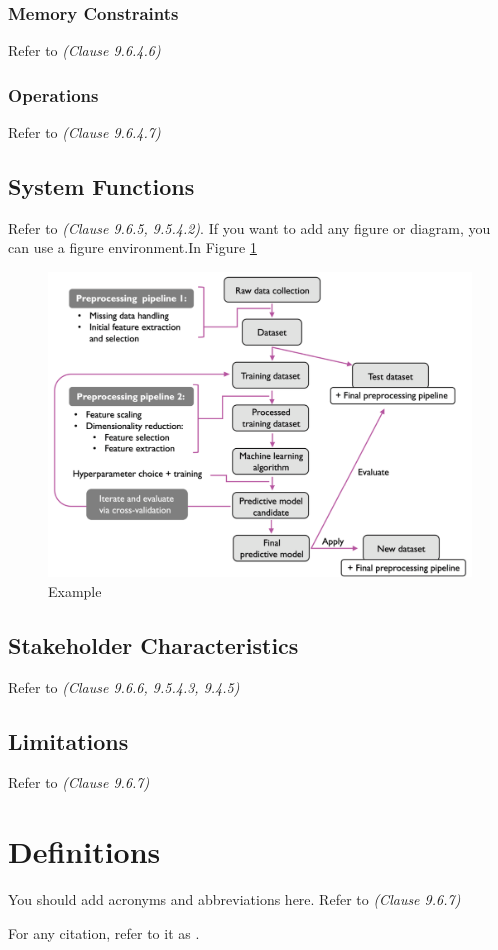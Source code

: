 \subsubsection{Memory Constraints}
Refer to \textit{(Clause 9.6.4.6)}
\subsubsection{Operations}
Refer to \textit{(Clause 9.6.4.7)}

\subsection{System Functions}

Refer to \textit{(Clause 9.6.5, 9.5.4.2)}. If you want to add any figure or diagram, you can use a figure environment.In Figure \ref{Fig:Example}

\begin{figure}[ht]
\centering
\includegraphics[width=.9 \textwidth]{Figures/ExampleFigure.png}
\caption{Example \label{Fig:Example}}
\end{figure}


\subsection{Stakeholder Characteristics}

Refer to \textit{(Clause 9.6.6, 9.5.4.3, 9.4.5)}

\subsection{Limitations}

Refer to \textit{(Clause 9.6.7)}

\section{Definitions}

You should add acronyms and abbreviations here. Refer to \textit{(Clause 9.6.7)}



For any citation, refer to it as \cite{younis2021hybrid}.
